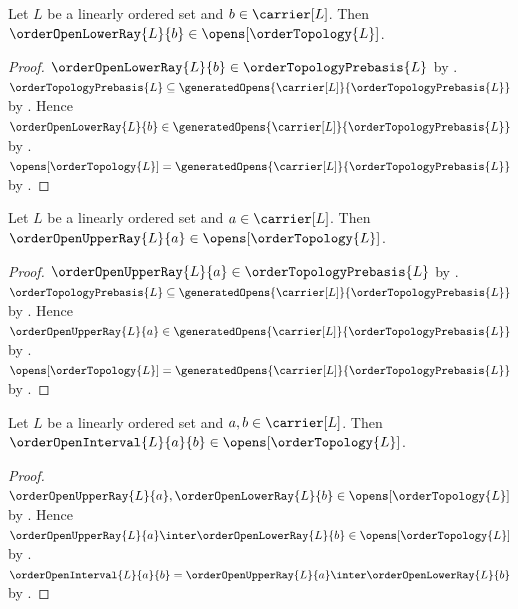 \begin{theorem}\label{order_open_lower_ray_is_open}
    Let $L$ be a linearly ordered set and $b\in\carrier[L]$.
    Then $\orderOpenLowerRay{L}{b}\in\opens[\orderTopology{L}]$.
\end{theorem}
\begin{proof}
    $\orderOpenLowerRay{L}{b}\in\orderTopologyPrebasis{L}$ by
        .
    $\orderTopologyPrebasis{L}\subseteq
        \generatedOpens{\carrier[L]}{\orderTopologyPrebasis{L}}$ by
        .
    Hence $\orderOpenLowerRay{L}{b}\in
        \generatedOpens{\carrier[L]}{\orderTopologyPrebasis{L}}$ by
        .
    $\opens[\orderTopology{L}]
        =\generatedOpens{\carrier[L]}{\orderTopologyPrebasis{L}}$ by
        .
\end{proof}

\begin{theorem}\label{order_open_upper_ray_is_open}
    Let $L$ be a linearly ordered set and $a\in\carrier[L]$.
    Then $\orderOpenUpperRay{L}{a}\in\opens[\orderTopology{L}]$.
\end{theorem}
\begin{proof}
    $\orderOpenUpperRay{L}{a}\in\orderTopologyPrebasis{L}$ by
        .
    $\orderTopologyPrebasis{L}\subseteq
        \generatedOpens{\carrier[L]}{\orderTopologyPrebasis{L}}$ by
        .
    Hence $\orderOpenUpperRay{L}{a}\in
        \generatedOpens{\carrier[L]}{\orderTopologyPrebasis{L}}$ by
        .
    $\opens[\orderTopology{L}]
        =\generatedOpens{\carrier[L]}{\orderTopologyPrebasis{L}}$ by
        .
\end{proof}

\begin{theorem}\label{order_open_interval_is_open}
    Let $L$ be a linearly ordered set and $a,b\in\carrier[L]$.
    Then $\orderOpenInterval{L}{a}{b}\in\opens[\orderTopology{L}]$.
\end{theorem}
\begin{proof}
    $\orderOpenUpperRay{L}{a},\orderOpenLowerRay{L}{b}
        \in\opens[\orderTopology{L}]$ by
        .
    Hence $\orderOpenUpperRay{L}{a}\inter\orderOpenLowerRay{L}{b}
        \in\opens[\orderTopology{L}]$ by
        .
    $\orderOpenInterval{L}{a}{b}
        =\orderOpenUpperRay{L}{a}\inter\orderOpenLowerRay{L}{b}$ by
        .
\end{proof}

